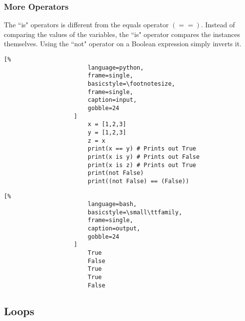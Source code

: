 \documentclass[crop=false,class=book]{standalone}
\begin{document}
            \subsubsection{More Operators}
                The ``is" operators is different from the equals
                operator $(==)$. Instead of comparing the values of
                the variables, the ``is" operator compares the
                instances themselves. Using the ``not" operator on a
                Boolean expression simply inverts it.\newline
                \begin{minipage}[t]{.48\textwidth}
                    \centering
                    \begin{lstlisting}[%
                        language=python,
                        frame=single,
                        basicstyle=\footnotesize,
                        frame=single,
                        caption=input,
                        gobble=24
                    ]
                        x = [1,2,3]
                        y = [1,2,3]
                        z = x
                        print(x == y) # Prints out True
                        print(x is y) # Prints out False
                        print(x is z) # Prints out True
                        print(not False)
                        print((not False) == (False))
                    \end{lstlisting}
                \end{minipage}\hfill
                \begin{minipage}[t]{.48\textwidth}
                    \centering
                    \begin{lstlisting}[%
                        language=bash,
                        basicstyle=\small\ttfamily,
                        frame=single,
                        caption=output,
                        gobble=24
                    ]
                        True
                        False
                        True
                        True
                        False
                    \end{lstlisting}
                \end{minipage}
        \subsection{Loops}
\end{document}
